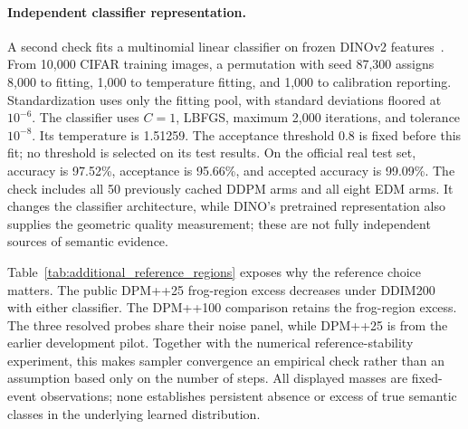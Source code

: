 \paragraph{Independent classifier representation.}
A second check fits a multinomial linear classifier on frozen DINOv2
features~\cite{oquab2024dinov2}. From 10,000 CIFAR training images, a
permutation with seed 87,300 assigns 8,000 to fitting, 1,000 to temperature
fitting, and 1,000 to calibration reporting. Standardization uses only
the fitting pool, with standard deviations floored at $10^{-6}$.
The classifier uses $C=1$, LBFGS, maximum 2,000 iterations, and tolerance
$10^{-8}$. Its temperature is 1.51259. The acceptance threshold 0.8 is fixed
before this fit; no threshold is selected on its test results.
On the official real test set, accuracy is 97.52\%, acceptance is 95.66\%,
and accepted accuracy is 99.09\%. The check includes all 50 previously
cached DDPM arms and all eight EDM arms. It changes the classifier
architecture, while DINO's pretrained representation also supplies the
geometric quality measurement; these are not fully independent sources
of semantic evidence.

Table~\ref{tab:additional_reference_regions} exposes why the reference
choice matters. The public DPM++25 frog-region excess decreases under
DDIM200 with either classifier. The DPM++100 comparison retains the frog-region excess. The three resolved probes share their
noise panel, while DPM++25 is from the earlier development pilot.
Together with the numerical reference-stability experiment, this makes
sampler convergence an empirical check rather than an assumption based
only on the number of steps. All displayed masses are fixed-event
observations; none establishes persistent absence or excess of true
semantic classes in the underlying learned distribution.

